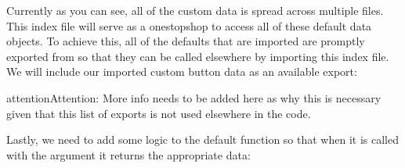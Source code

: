 \documentclass[letterpaper,10pt,english]{sphinxmanual}
\begin{document}
%
\begin{sphinxVerbatim}[commandchars=\\\{\},numbers=left,firstnumber=1,stepnumber=1]
\end{sphinxVerbatim}
\sphinxresetverbatimhllines

\sphinxAtStartPar
Currently as you can see, all of the custom data is spread across multiple files. This index file will serve as a one\sphinxhyphen{}stop\sphinxhyphen{}shop to access all of these default data objects. To achieve this, all of the defaults that are imported are promptly exported from  so that they can be called elsewhere by importing this index file. We will include our imported custom button data as an available export:

\begin{sphinxadmonition}{attention}{Attention:}
\sphinxAtStartPar
More info needs to be added here as why this is necessary given that this list of exports is not used elsewhere in the code.
\end{sphinxadmonition}

%
\begin{sphinxVerbatim}[commandchars=\\\{\},numbers=left,firstnumber=1,stepnumber=1]
\end{sphinxVerbatim}
\sphinxresetverbatimhllines

\sphinxAtStartPar
Lastly, we need to add some logic to the default function  so that when it is called with the argument  it returns the appropriate data:
\end{document}
